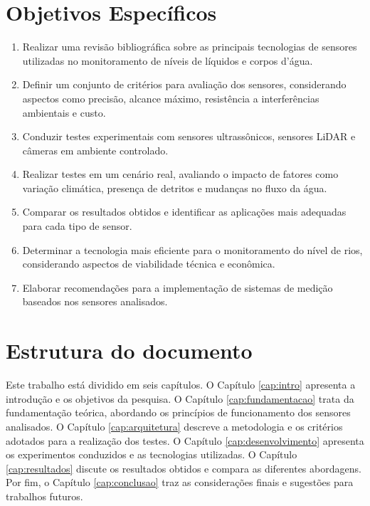 \section{Objetivos Específicos}

\begin{enumerate}

    \item Realizar uma revisão bibliográfica sobre as principais tecnologias de sensores utilizadas no monitoramento de níveis de líquidos e corpos d'água.
    
    \item Definir um conjunto de critérios para avaliação dos sensores, considerando aspectos como precisão, alcance máximo, resistência a interferências ambientais e custo.

    \item Conduzir testes experimentais com sensores ultrassônicos, sensores LiDAR e câmeras em ambiente controlado.

    \item Realizar testes em um cenário real, avaliando o impacto de fatores como variação climática, presença de detritos e mudanças no fluxo da água.

    \item Comparar os resultados obtidos e identificar as aplicações mais adequadas para cada tipo de sensor.

    \item Determinar a tecnologia mais eficiente para o monitoramento do nível de rios, considerando aspectos de viabilidade técnica e econômica.

    \item Elaborar recomendações para a implementação de sistemas de medição baseados nos sensores analisados.

\end{enumerate}

\section{Estrutura do documento}

Este trabalho está dividido em seis capítulos. O Capítulo \ref{cap:intro} apresenta a introdução e os objetivos da pesquisa. O Capítulo \ref{cap:fundamentacao} trata da fundamentação teórica, abordando os princípios de funcionamento dos sensores analisados. O Capítulo \ref{cap:arquitetura} descreve a metodologia e os critérios adotados para a realização dos testes. O Capítulo \ref{cap:desenvolvimento} apresenta os experimentos conduzidos e as tecnologias utilizadas. O Capítulo \ref{cap:resultados} discute os resultados obtidos e compara as diferentes abordagens. Por fim, o Capítulo \ref{cap:conclusao} traz as considerações finais e sugestões para trabalhos futuros.

